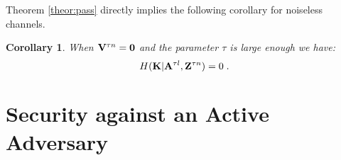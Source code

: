 \documentclass{article}[11pt]
\newcommand{\am}{\mathbf{A}}
\newcommand{\km}{\mathbf{K}}
\newcommand{\vm}{\mathbf{V}}
\newcommand{\zm}{\mathbf{Z}}
\newtheorem{cor}{Corollary}
\begin{document}
\noindent Theorem \ref{theor:pass} directly implies the following corollary for noiseless
channels.

\begin{cor} When $\vm^{\tau n} = {\bf
0}$ and the parameter $\tau$ is large enough we have:
\begin{equation}
H(\km |\am^{\tau l},\zm^{\tau n}) = 0 \;. \\
\end{equation}
\end{cor}



\section{Security against an Active Adversary}
\label{sec:active}
\end{document}
